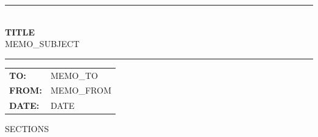 \documentclass[11pt,letterpaper]{article}
\begin{document}
\thispagestyle{fancy}

\begin{center}
{\color{rulecolor}\rule{\textwidth}{1.5pt}}\\[0.3cm]
{\Large\bfseries\sffamily\color{navyheading} {{TITLE}}}\\[0.15cm]
{\small\textsf{{{MEMO_SUBJECT}}}}\\[0.3cm]
{\color{rulecolor}\rule{\textwidth}{1.5pt}}
\end{center}

\vspace{0.3cm}

\begin{tabularx}{\textwidth}{@{}l X@{}}
\textsf{\textbf{TO:}}   & {{MEMO_TO}} \\[3pt]
\textsf{\textbf{FROM:}} & {{MEMO_FROM}} \\[3pt]
\textsf{\textbf{DATE:}} & {{DATE}} \\
\end{tabularx}

\vspace{0.4cm}

{{SECTIONS}}
\end{document}
